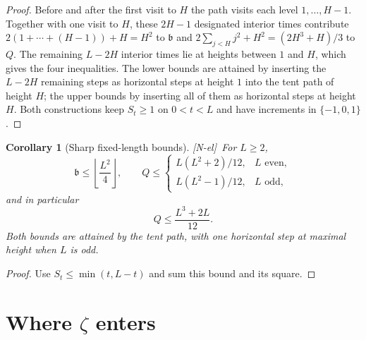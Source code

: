\documentclass[11pt]{amsart}
\numberwithin{equation}{section}
\theoremstyle{plain}
\newtheorem{corollary}[theorem]{Corollary}
\theoremstyle{definition}
\theoremstyle{remark}
\newcommand{\tagNE}{\textup{[N-el]}}
\begin{document}
\begin{proof}
Before and after the first visit to $H$ the path visits each level
$1,\dots,H-1$. Together with one visit to $H$, these $2H-1$ designated
interior times contribute $2(1+\cdots+(H-1))+H=H^2$ to $\mathfrak b$ and
$2\sum_{j<H}j^2+H^2=(2H^3+H)/3$ to $Q$. The remaining $L-2H$ interior times
lie at heights between $1$ and $H$, which gives the four inequalities. The
lower bounds are attained by inserting the $L-2H$ remaining steps as
horizontal steps at height $1$ into the tent path of height $H$; the upper
bounds by inserting all of them as horizontal steps at height $H$. Both
constructions keep $S_t\ge1$ on $0<t<L$ and have increments in
$\{-1,0,1\}$.
\end{proof}

\begin{corollary}[Sharp fixed-length bounds]
\label{cor:fixed-L}
\tagNE\ For $L\ge2$,
\[
\mathfrak b\le\left\lfloor\frac{L^2}{4}\right\rfloor,\qquad
Q\le
\begin{cases}
L(L^2+2)/12,&L\text{ even},\\
L(L^2-1)/12,&L\text{ odd},
\end{cases}
\]
and in particular
\begin{equation}
\label{eq:Q_upper}
Q\le\frac{L^3+2L}{12}.
\end{equation}
Both bounds are attained by the tent path, with one horizontal step at
maximal height when $L$ is odd.
\end{corollary}

\begin{proof}
Use $S_t\le\min(t,L-t)$ and sum this bound and its square.
\end{proof}


\section{Where \texorpdfstring{$\zeta$}{zeta} enters}
\label{sec:zeta}
\end{document}
